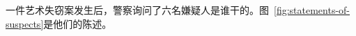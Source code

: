 \begin{example}[失窃的艺术品]
  一件艺术失窃案发生后，警察询问了六名嫌疑人是谁干的。图~\ref{fig:statements-of-suspects}是他们的陈述。









\end{example}
